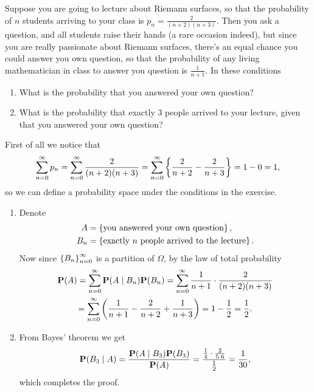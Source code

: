 \documentclass[11pt,a4paper]{article}
\begin{document}
\begin{exercise}
  \label{ex:riemann-surfaces}
  Suppose you are going to lecture about Riemann surfaces,
  so that the probability of $n$ students arriving to your class is
  $p_n = \frac{2}{(n+2)(n+3)}$.
  Then you ask a question, and all students raise their hands (a rare occasion
  indeed), but since you are really passionate about Riemann surfaces,
  there's an equal chance you could answer you own question,
  so that the probability of any living mathematician in class to answer
  you question is $\frac{1}{n+1}$.
  In these conditions
  \begin{enumerate}
    \item[(1)] What is the probability that you answered your own question?
    \item[(2)] What is the probability that exactly $3$ people arrived
      to your lecture, given that you answered your own question?
  \end{enumerate}
\end{exercise}
\begin{solution}
  First of all we notice that
  \[
    \sum_{n=0}^{\infty} p_n =
    \sum_{n=0}^{\infty} \frac{2}{(n+2)(n+3)} =
    \sum_{n=0}^{\infty} \left\{\frac{2}{n+2} - \frac{2}{n+3}\right\} = 1 - 0 = 1,
  \]
  so we can define a probability space under the conditions in the exercise.
  \begin{enumerate}
    \item[(1)] Denote
      \begin{align*}
        A &= \left\{\text{you answered your own question}\right\}, \\
        B_n &= \left\{\text{exactly $n$ people arrived to the lecture}\right\}.
      \end{align*}
      Now since $\left\{B_n\right\}_{n=0}^{\infty}$ is a partition of $\Omega$,
      by the law of total probability
      \begin{multline*}
        \Prob(A) =
        \sum_{n=0}^{\infty} \Prob(A \mid B_n) \Prob(B_n) =
        \sum_{n=0}^{\infty} \frac{1}{n+1} \cdot \frac{2}{(n+2)(n+3)} \\ =
        \sum_{n=0}^{\infty} \del{\frac{1}{n+1} - \frac{2}{n+2} + \frac{1}{n+3}} =
        1 - \half = \half.
      \end{multline*}
    \item[(2)] From Bayes' theorem we get
      \[
        \mathbf{P}(B_3 \mid A) =
        \frac{\mathbf{P}(A \mid B_3) \mathbf{P}(B_3)}{\mathbf{P}(A)} =
        \frac{\frac{1}{4} \cdot \frac{2}{5 \cdot 6}}{\frac{1}{2}} = \frac{1}{30},
      \]
      which completes the proof.
  \end{enumerate}
\end{solution}
\end{document}

